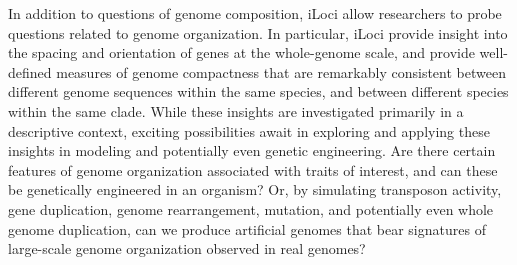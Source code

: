 In addition to questions of genome composition, iLoci allow researchers to probe questions related to genome organization.
In particular, iLoci provide insight into the spacing and orientation of genes at the whole-genome scale, and provide well-defined measures of genome compactness that are remarkably consistent between different genome sequences within the same species, and between different species within the same clade.
While these insights are investigated primarily in a descriptive context, exciting possibilities await in exploring and applying these insights in modeling and potentially even genetic engineering.
Are there certain features of genome organization associated with traits of interest, and can these be genetically engineered in an organism?
Or, by simulating transposon activity, gene duplication, genome rearrangement, mutation, and potentially even whole genome duplication, can we produce artificial genomes that bear signatures of large-scale genome organization observed in real genomes?








